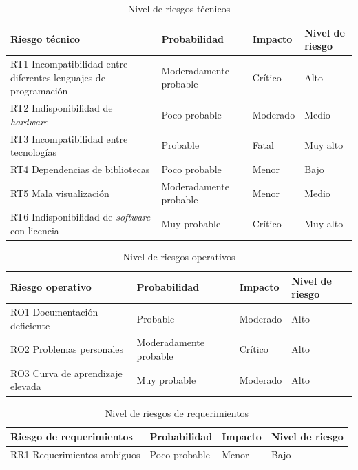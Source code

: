 \begin{table}[H]
	\centering
	\renewcommand{\arraystretch}{1.2}
	\setlength{\tabcolsep}{4pt}
	\begin{tabular}{|p{}|p{}|p{}|p{}|}
		\hline
		\textbf{Riesgo técnico} & \textbf{Probabilidad} & \textbf{Impacto} & \textbf{Nivel de riesgo} \\ \hline
		RT1 Incompatibilidad entre diferentes lenguajes de programación & Modera\-da\-men\-te probable & Crítico & Alto \\ \hline
		RT2 Indisponibilidad de \textit{hardware} & Poco probable & Moderado & Medio \\ \hline
		RT3 Incompatibilidad entre tecnologías & Probable & Fatal & Muy alto \\ \hline
		RT4 Dependencias de bibliotecas & Poco probable & Menor & Bajo\\ \hline
		RT5 Mala visualización & Modera\-da\-men\-te probable & Menor & Medio \\ \hline
		RT6 Indisponibilidad de \textit{software} con licencia & Muy probable & Crítico & Muy alto \\ \hline
	\end{tabular}
	\caption{Nivel de riesgos técnicos}
	\label{table:riesgos_tecnicos}
\end{table}

\begin{table}[H]
	\centering
	\renewcommand{\arraystretch}{1.2}
	\setlength{\tabcolsep}{4pt}
	\begin{tabular}{|p{}|p{}|p{}|p{}|}
		\hline
		\textbf{Riesgo operativo} & \textbf{Probabilidad} & \textbf{Impacto} & \textbf{Nivel de riesgo} \\ \hline
		RO1 Documentación deficiente & Probable & Moderado & Alto \\ \hline
		RO2 Problemas personales & Modera\-da\-men\-te probable & Crítico & Alto \\ \hline
		RO3 Curva de aprendizaje elevada & Muy probable & Moderado & Alto \\ \hline
	\end{tabular}
	\caption{Nivel de riesgos operativos}
	\label{table:riesgos_operativos}
\end{table}

\begin{table}[H]
	\centering
	\renewcommand{\arraystretch}{1.2}
	\setlength{\tabcolsep}{4pt}
	\begin{tabular}{|p{}|p{}|p{}|p{}|}
		\hline
		\textbf{Riesgo de requerimientos} & \textbf{Probabilidad} & \textbf{Impacto} & \textbf{Nivel de riesgo} \\ \hline
		RR1 Requerimientos ambiguos & Poco probable & Menor & Bajo \\ \hline
	\end{tabular}
	\caption{Nivel de riesgos de requerimientos}
	\label{table:riesgos_requerimientos}
\end{table}

